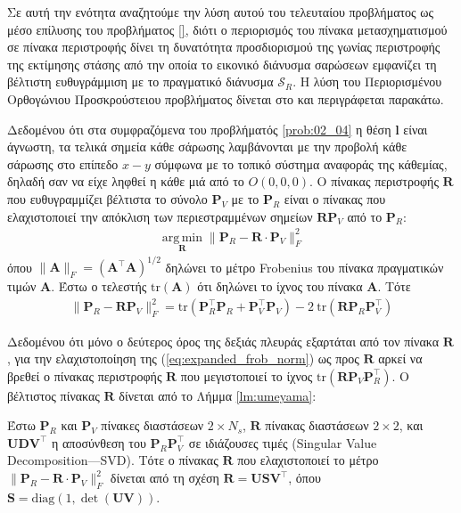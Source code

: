 Σε αυτή την ενότητα αναζητούμε την λύση αυτού του τελευταίου προβλήματος ως
μέσο επίλυσης του προβλήματος \ref{}, διότι ο περιορισμός του πίνακα
μετασχηματισμού σε πίνακα περιστροφής δίνει τη δυνατότητα προσδιορισμού της
γωνίας περιστροφής της εκτίμησης στάσης από την οποία το εικονικό διάνυσμα
σαρώσεων εμφανίζει τη βέλτιστη ευθυγράμμιση με το πραγματικό διάνυσμα
$\mathcal{S}_R$. Η λύση του Περιορισμένου Ορθογώνιου Προσκρούστειου προβλήματος
δίνεται στο \cite{Umeyama1991} και περιγράφεται παρακάτω.

Δεδομένου ότι στα συμφραζόμενα του προβλήματός \ref{prob:02_04} η θέση $\bm{l}$
είναι άγνωστη, τα τελικά σημεία κάθε σάρωσης λαμβάνονται με την προβολή κάθε
σάρωσης στο επίπεδο $x-y$ σύμφωνα με το τοπικό σύστημα αναφοράς της κάθεμίας,
δηλαδή σαν να είχε ληφθεί η κάθε μιά από το $O(0,0,0)$. Ο πίνακας περιστροφής
$\bm{R}$ που ευθυγραμμίζει βέλτιστα το σύνολο $\bm{P}_V$ με το $\bm{P}_R$ είναι
ο πίνακας που ελαχιστοποιεί την απόκλιση των περιεστραμμένων σημείων
$\bm{R}\bm{P}_V$ από το $\bm{P}_R$:
\begin{align}
  \operatorname*{arg\,min}\limits_{\bm{R}} \|\bm{P}_R - \bm{R} \cdot \bm{P}_V\|_F^2 \nonumber
\end{align}
όπου $\|\bm{A}\|_F = (\bm{A}^\top\bm{A})^{1/2}$ δηλώνει το μέτρο Frobenius του
πίνακα πραγματικών τιμών $\bm{A}$. Έστω ο τελεστής $\text{tr}(\bm{A})$ ότι
δηλώνει το ίχνος του πίνακα $\bm{A}$. Τότε
\begin{align}
  \|\bm{P}_R - \bm{R} \bm{P}_V\|_F^2 = \text{tr}(\bm{P}_R^\top \bm{P}_R + \bm{P}_V^\top \bm{P}_V) - 2 \ \text{tr}(\bm{R} \bm{P}_R \bm{P}_V^\top)
  \label{eq:expanded_frob_norm}
\end{align}

Δεδομένου ότι μόνο ο δεύτερος όρος της δεξιάς πλευράς εξαρτάται από τον πίνακα
$\bm{R}$, για την ελαχιστοποίηση της (\ref{eq:expanded_frob_norm}) ως προς
$\bm{R}$ αρκεί να βρεθεί ο πίνακας περιστροφής $\bm{R}$ που μεγιστοποιεί
το ίχνος $\text{tr}(\bm{R} \bm{P}_V \bm{P}_R^\top)$. Ο βέλτιστος πίνακας
$\bm{R}$ δίνεται από το Λήμμα \ref{lm:umeyama}:

\begin{lemma}
  \label{lm:umeyama}
  Έστω $\bm{P}_R$ και $\bm{P}_V$ πίνακες διαστάσεων $2 \times N_s$, $\bm{R}$
  πίνακας διαστάσεων $2 \times 2$, και $\bm{U} \bm{D} \bm{V}^\top$ η αποσύνθεση
  του $\bm{P}_R \bm{P}_V^\top$ σε ιδιάζουσες τιμές (Singular Value
  Decomposition---SVD). Τότε ο πίνακας $\bm{R}$ που ελαχιστοποιεί το μέτρο
  $\|\bm{P}_R - \bm{R} \cdot \bm{P}_V\|_F^2$ δίνεται από τη σχέση
  $\bm{R} = \bm{U} \bm{S} \bm{V}^\top$, όπου
  $\bm{S} = \text{diag}(1,\det{(\bm{U}\bm{V})})$.
\end{lemma}

